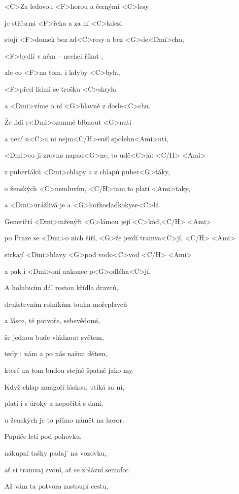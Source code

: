 

\zs
<C>Za ledovou <F>horou a černými <C>lesy

je stříbrná <F>řeka a za ní <C>kdesi

stojí <F>domek bez ad<C>resy a bez <G>de<Dmi>chu,

<F>bydlí v něm -- nechci říkat ,

ale co <F>na tom, i kdyby <C>byla,

<F>před lidmi se trošku <C>skryla

a <Dmi>víme o ní <G>hlavně z dosle<C>chu.
\ks

\zr
Že lidi r<Dmi>ozumné blbnout <G>nutí

a není n<C>a ni nejm<C/H>enší spolehn<Ami>utí,

<Dmi>co ji zrovna napad<G>ne, to udě<C>lá: <C/H> <Ami>

z puberťáků <Dmi>chlapy a z chlapů puber<G>ťáky,

o ženských <C>nemluvím, <C/H>tam to platí <Ami>taky,

a <Dmi>urážlivá je a <G>hořkosladkokyse<C>lá.
\kr

\zs
Genetičtí <Dmi>inženýři <G>lámou její <C>kód,<C/H> <Ami>

po Praze se <Dmi>o nich šíří, <G>že jezdí tramva<C>jí, <C/H> <Ami>

strkají <Dmi>hlavy <G>pod vodo<C>vod <C/H> <Ami>

a pak i <Dmi>oni nakonec p<G>odléha<C>jí.
\ks

\zr
A holubicím dál rostou křídla dravců,

družstevním rolníkům touha mořeplavců

a lásce, té potvoře, sebevědomí,

že jednou bude vládnout světem,

tedy i nám a po nás našim dětem,

které na tom budou stejně špatně jako my.
\kr

\zr
Když chlap zmagoří láskou, utíká za ní,

platí i s úroky a nepočítá s daní,

u ženských je to přímo námět na horor.

Papuče letí pod pohovku,

nákupní tašky padaj' na vozovku,

ať si tramvaj zvoní, ať se zblázní semafor.
\kr

\zs
Až vám ta potvora zastoupí cestu,

